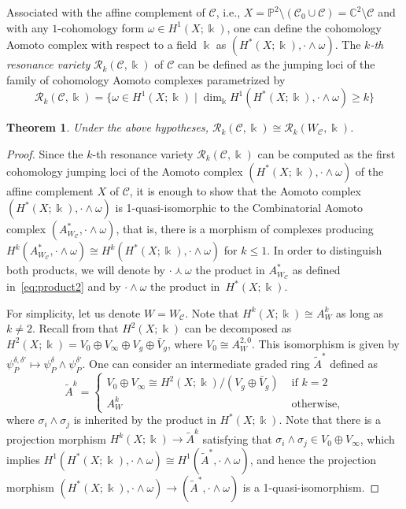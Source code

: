 \documentclass[11pt]{amsart}
\def\cC{\mathcal{C}}
\def\cR{{\mathcal R}}
\def\CC{\mathbb{C}}
\def\PP{\mathbb{P}}
\def\kk{\Bbbk}
\def\w{\omega}
\theoremstyle{plain}
\newtheorem{thm}{Theorem}
\theoremstyle{definition}
\begin{document}
Associated with the affine complement of $\cC$, i.e., $X=\PP^2\setminus (\cC_0\cup\cC)=\CC^2\setminus\cC$ and with
any $1$-cohomology form $\omega\in H^1(X;\kk)$, one can define the cohomology Aomoto complex with respect to
a field $\kk$ as $(H^*(X;\kk),\cdot\wedge\w)$. The \emph{$k$-th resonance variety}
$\cR_k(\cC,\kk)$ of $\cC$ can be defined as the jumping loci of the family of cohomology Aomoto complexes
parametrized by
$$
\cR_k(\cC,\kk)=\{\w\in H^1(X;\kk)\mid \dim_\kk H^1(H^*(X;\kk),\cdot\wedge\w)\geq k\}
$$

\begin{thm}
\label{thm:resonance}
Under the above hypotheses, $\cR_k(\cC,\kk)\cong\cR_k(W_\cC,\kk)$.
\end{thm}

\begin{proof}
Since the $k$-th resonance variety $\cR_k(\cC,\kk)$ can be computed as the first cohomology jumping loci of the Aomoto complex $(H^*(X;\kk),\cdot\wedge\w)$ of the affine complement $X$ of $\cC$, it is enough to show that the Aomoto complex $(H^*(X;\kk),\cdot\wedge\w)$ is 1-quasi-isomorphic to the Combinatorial Aomoto complex $(A^*_{W_\cC},\cdot\wedge\w)$, that is,
there is a morphism of complexes producing $H^k(A^*_{W_\cC},\cdot\wedge\w)\cong H^k(H^*(X;\kk),\cdot\wedge\w)$ for $k\leq 1$. 
In order to distinguish both products, we will denote by $\cdot\curlywedge\w$ the product in $A^*_{W_{\cC}}$ as defined in~\eqref{eq:product2} and by $\cdot\wedge\w$ the product in~$H^*(X;\kk)$.

For simplicity, let us denote $W=W_\cC$.
Note that $H^k(X;\kk)\cong A^k_W$ as long as $k\neq 2$. Recall from \cite{CM} that $H^2(X;\kk)$ can be decomposed as
$H^2(X;\kk)=V_0\oplus V_\infty\oplus V_g\oplus \bar V_g$, where $V_0\cong A^{2,0}_W$. 
This isomorphism is given by $\psi_P^{\delta,\delta'}\mapsto \psi_P^\delta\wedge\psi_P^{\delta'}$.
One can consider an intermediate graded ring $\tilde A^*$ defined as
$$
\tilde A^k=
\begin{cases}
V_0\oplus V_\infty\cong H^2(X;\kk)/(V_g\oplus \bar V_g) & \textrm{ if } k = 2\\
A^k_W & \textrm{ otherwise,}
\end{cases}
$$
where $\sigma_i\wedge\sigma_j$ is inherited by the product in $H^*(X;\kk)$. Note that
there is a projection morphism $H^k(X;\kk)\to \tilde A^k$ satisfying that
$\sigma_i\wedge\sigma_j\in V_0\oplus V_\infty$, which implies 
$H^1(H^*(X;\kk),\cdot\wedge\w)\cong H^1(\tilde A^*,\cdot\wedge\w)$,  
and hence
the projection morphism $(H^*(X;\kk),\cdot\wedge\w)\to (\tilde A^*,\cdot\wedge\w)$ is a 1-quasi-isomorphism.


\end{proof}
\end{document}
